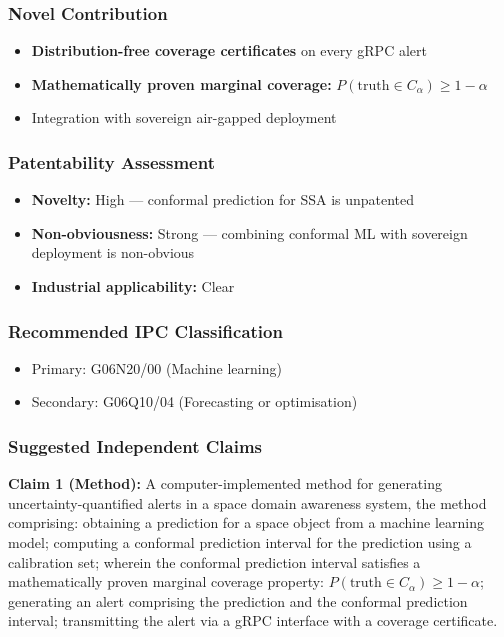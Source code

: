 \documentclass[11pt,a4paper]{article}
\begin{document}
\subsubsection*{Novel Contribution}
\begin{itemize}
\item \textbf{Distribution-free coverage certificates} on every gRPC alert
\item \textbf{Mathematically proven marginal coverage:} $P(\text{truth} \in C_\alpha) \geq 1 - \alpha$
\item Integration with sovereign air-gapped deployment
\end{itemize}

\subsubsection*{Patentability Assessment}
\begin{itemize}
\item \textbf{Novelty:} High — conformal prediction for SSA is unpatented
\item \textbf{Non-obviousness:} Strong — combining conformal ML with sovereign deployment is non-obvious
\item \textbf{Industrial applicability:} Clear
\end{itemize}

\subsubsection*{Recommended IPC Classification}
\begin{itemize}
\item Primary: G06N20/00 (Machine learning)
\item Secondary: G06Q10/04 (Forecasting or optimisation)
\end{itemize}

\subsubsection*{Suggested Independent Claims}

\textbf{Claim 1 (Method):} A computer-implemented method for generating uncertainty-quantified alerts in a space domain awareness system, the method comprising: obtaining a prediction for a space object from a machine learning model; computing a conformal prediction interval for the prediction using a calibration set; wherein the conformal prediction interval satisfies a mathematically proven marginal coverage property: $P(\text{truth} \in C_\alpha) \geq 1 - \alpha$; generating an alert comprising the prediction and the conformal prediction interval; transmitting the alert via a gRPC interface with a coverage certificate.
\end{document}
